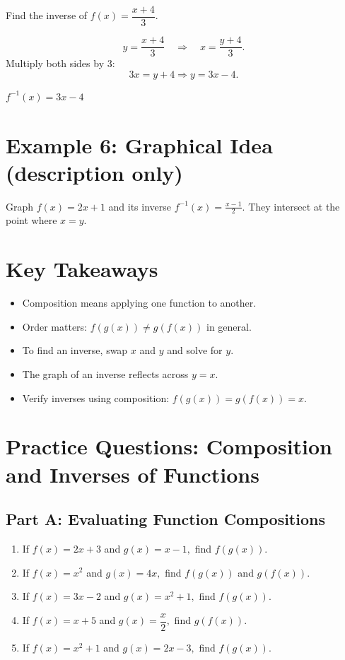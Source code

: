 \documentclass[14pt]{extarticle}
\begin{document}
Find the inverse of \(f(x) = \dfrac{x + 4}{3}.\)

\[
y = \frac{x + 4}{3} \quad \Rightarrow \quad x = \frac{y + 4}{3}.
\]
Multiply both sides by 3:
\[
3x = y + 4 \Rightarrow y = 3x - 4.
\]

\(\boxed{f^{-1}(x) = 3x - 4}\)

\section*{Example 6: Graphical Idea (description only)}

Graph \(f(x) = 2x + 1\) and its inverse \(f^{-1}(x) = \frac{x - 1}{2}\).  
They intersect at the point where \(x = y\).

\section*{Key Takeaways}
\begin{itemize}
  \item Composition means applying one function to another.
  \item Order matters: \(f(g(x)) \neq g(f(x))\) in general.
  \item To find an inverse, swap \(x\) and \(y\) and solve for \(y\).
  \item The graph of an inverse reflects across \(y = x\).
  \item Verify inverses using composition: \(f(g(x)) = g(f(x)) = x.\)
\end{itemize}

\newpage


\section*{Practice Questions: Composition and Inverses of Functions}

\subsection*{Part A: Evaluating Function Compositions}
\begin{enumerate}
  \item If \(f(x) = 2x + 3\) and \(g(x) = x - 1,\) find \(f(g(x))\).
  \item If \(f(x) = x^2\) and \(g(x) = 4x,\) find \(f(g(x))\) and \(g(f(x))\).
  \item If \(f(x) = 3x - 2\) and \(g(x) = x^2 + 1,\) find \(f(g(x))\).
  \item If \(f(x) = x + 5\) and \(g(x) = \dfrac{x}{2},\) find \(g(f(x))\).
  \item If \(f(x) = x^2 + 1\) and \(g(x) = 2x - 3,\) find \(f(g(x))\).
\end{enumerate}
\end{document}
